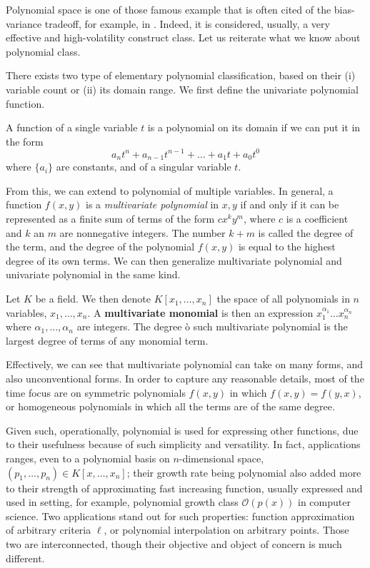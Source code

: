 \documentclass[
  journal=largetwo,
  year=2025,
  volume=37,
]{cup-journal}
\begin{document}
Polynomial space is one of those famous example that is often cited of the bias-variance tradeoff, for example, in \cite{goodfellow2016deep,10.5555/2930837}. Indeed, it is considered, usually, a very effective and high-volatility construct class. Let us reiterate what we know about polynomial class. 

There exists two type of elementary polynomial classification, based on their (i) variable count or (ii) its domain range. We first define the univariate polynomial function.

\begin{definition}
    A function of a single variable $t$ is a polynomial on its domain if we can put it in the form 
    \begin{equation}
        a_{n}t^{n} + a_{n-1}t^{n-1} + \dots + a_{1}t + a_{0}t^{0}
    \end{equation}
    where $\{a_{i}\}$ are constants, and of a singular variable $t$.  
\end{definition}

From this, we can extend to polynomial of multiple variables. In general, a function $f(x,y)$ is a \textit{multivariate polynomial} in $x,y$ if and only if it can be represented as a finite sum of terms of the form $cx^{k}y^{m}$, where $c$ is a coefficient and $k$ an $m$ are nonnegative integers. The number $k+m$ is called the degree of the term, and the degree of the polynomial $f(x,y)$ is equal to the highest degree of its own terms. We can then generalize multivariate polynomial and univariate polynomial in the same kind. 

\begin{definition}
    Let $K$ be a field. We then denote $K[x_{1},\dots,x_{n}]$ the space of all polynomials in $n$ variables, $x_{1},\dots,x_{n}$. A \textbf{multivariate monomial} is then an expression $x_{1}^{\alpha_{1}}\dots x_{n}^{\alpha_{n}}$ where $\alpha_{1},\dots,\alpha_{n}$ are integers. The degree ò such multivariate polynomial is the largest degree of terms of any monomial term.
\end{definition}
Effectively, we can see that multivariate polynomial can take on many forms, and also unconventional forms. In order to capture any reasonable details, most of the time focus are on symmetric polynomials $f(x,y)$ in which $f(x,y)=f(y,x)$, or homogeneous polynomials in which all the terms are of the same degree. 

Given such, operationally, polynomial is used for expressing other functions, due to their usefulness because of such simplicity and versatility. In fact, applications ranges, even to a polynomial basis on $n$-dimensional space, $(p_{1},\dots,p_{n})\in K[x,\dots,x_{n}]$; their growth rate being polynomial also added more to their strength of approximating fast increasing function, usually expressed and used in setting, for example, polynomial growth class $\mathcal{O}(p(x))$ in computer science. Two applications stand out for such properties: function approximation of arbitrary criteria $\ell$, or polynomial interpolation on arbitrary points. Those two are interconnected, though their objective and object of concern is much different. 
\end{document}
